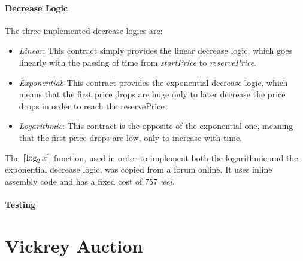 \documentclass[11pt, a4paper]{report}
\DeclarePairedDelimiter{\ceil}{\lceil}{\rceil}
\begin{document}
	
	\paragraph*{Decrease Logic}
	The three implemented decrease logics are:
	\begin{itemize}
		\item \emph{Linear}: This contract simply provides the linear decrease logic, which goes linearly with the passing of time from \emph{startPrice} to \emph{reservePrice}.
		\item \emph{Exponential}: This contract provides the exponential decrease logic, which means that the first price drops are huge only to later decrease the price drops in order to reach the reservePrice
		\item \emph{Logarithmic}: This contract is the opposite of the exponential one, meaning that the first price drops are low, only to increase with time.
	\end{itemize}
	The $\ceil{\log_2x}$ function, used in order to implement both the logarithmic and the exponential decrease logic, was copied from a forum online. It uses inline assembly code and has a fixed cost of 757 \emph{wei}.
	
	\paragraph*{Testing}
	

\section*{Vickrey Auction}
\label{sec:vickreyAuction}
\end{document}
